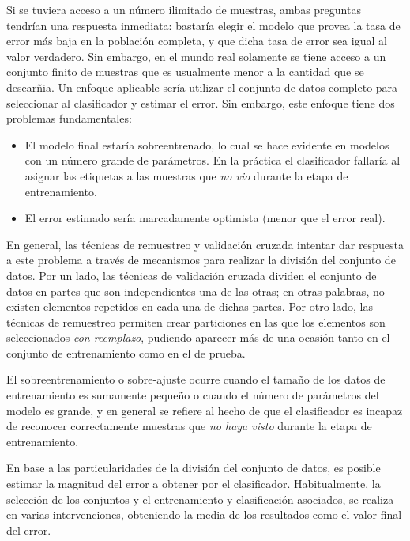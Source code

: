 \documentclass{article}
\begin{document}
Si se tuviera acceso a un número ilimitado de muestras, ambas preguntas tendrían una respuesta inmediata: bastaría elegir el modelo que provea la tasa de error más baja en la población completa, y que dicha tasa de error sea igual al valor verdadero.
Sin embargo, en el mundo real solamente se tiene acceso a un conjunto finito de muestras que es usualmente menor a la cantidad que se desearñia.
Un enfoque aplicable sería utilizar el conjunto de datos completo para seleccionar al clasificador y estimar el error. Sin embargo, este enfoque tiene dos problemas fundamentales:
\begin{itemize}
	\item El modelo final estaría sobreentrenado, lo cual se hace evidente en modelos con un número grande de parámetros. En la práctica el clasificador fallaría al asignar las etiquetas a las muestras que \emph{no vio} durante la etapa de entrenamiento.
	\item El error estimado sería marcadamente optimista (menor que el error real).
\end{itemize}


En general, las técnicas de remuestreo y validación cruzada intentar dar respuesta a este problema a través de mecanismos para realizar la división del conjunto de  datos.
Por un lado, las técnicas de validación cruzada dividen el conjunto de datos en partes que son independientes una de las otras; en otras palabras, no existen elementos repetidos en cada una de dichas partes.
Por otro lado, las técnicas de remuestreo permiten crear particiones en las que los elementos son seleccionados \emph{con reemplazo}, pudiendo aparecer más de una ocasión tanto en el conjunto de entrenamiento como en el de prueba.

El sobreentrenamiento o sobre-ajuste ocurre cuando el tamaño de los datos de entrenamiento es sumamente pequeño o cuando el número de parámetros del modelo es grande, y en general se refiere al hecho de que el clasificador es incapaz de reconocer correctamente muestras que \emph{no haya visto} durante la etapa de entrenamiento.

En base a las particularidades de la división del conjunto de datos, es posible estimar la magnitud del error a obtener por el clasificador.
Habitualmente, la selección de los conjuntos y el entrenamiento y clasificación asociados, se realiza en varias intervenciones, obteniendo la media de los resultados como el valor final del error.
\end{document}
